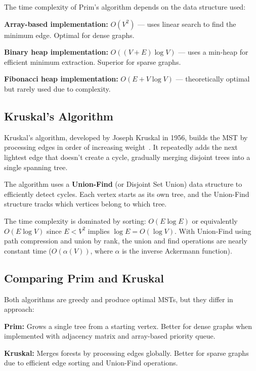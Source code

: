 \documentclass[12pt, a4paper]{report}
\begin{document}
The time complexity of Prim's algorithm depends on the data structure used:

\begin{dashenum}
  \item \textbf{Array-based implementation:} $O(V^2)$ — uses linear search to find the minimum edge. Optimal for dense graphs.
  \item \textbf{Binary heap implementation:} $O((V + E) \log V)$ — uses a min-heap for efficient minimum extraction. Superior for sparse graphs.
  \item \textbf{Fibonacci heap implementation:} $O(E + V \log V)$ — theoretically optimal but rarely used due to complexity.
\end{dashenum}

\subsection{Kruskal's Algorithm}

Kruskal's algorithm, developed by Joseph Kruskal in 1956, builds the MST by processing edges in order of increasing weight~\cite{ref:kruskal}. It repeatedly adds the next lightest edge that doesn't create a cycle, gradually merging disjoint trees into a single spanning tree.

The algorithm uses a \textbf{Union-Find} (or Disjoint Set Union) data structure to efficiently detect cycles. Each vertex starts as its own tree, and the Union-Find structure tracks which vertices belong to which tree.

The time complexity is dominated by sorting: $O(E \log E)$ or equivalently $O(E \log V)$ since $E < V^2$ implies $\log E = O(\log V)$. With Union-Find using path compression and union by rank, the union and find operations are nearly constant time ($O(\alpha(V))$, where $\alpha$ is the inverse Ackermann function).

\subsection{Comparing Prim and Kruskal}

Both algorithms are greedy and produce optimal MSTs, but they differ in approach:

\begin{dashenum}
  \item \textbf{Prim:} Grows a single tree from a starting vertex. Better for dense graphs when implemented with adjacency matrix and array-based priority queue.
  \item \textbf{Kruskal:} Merges forests by processing edges globally. Better for sparse graphs due to efficient edge sorting and Union-Find operations.
\end{dashenum}
\end{document}
